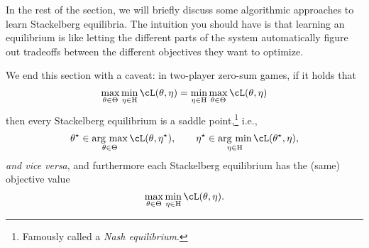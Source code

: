 \documentclass[../../book-main.tex]{subfiles}
\begin{document}
In the rest of the section, we will briefly discuss some algorithmic approaches to learn Stackelberg equilibria. The intuition you should have is that learning an equilibrium is like letting the different parts of the system automatically figure out tradeoffs between the different objectives they want to optimize. 

We end this section with a caveat: in two-player zero-sum games, if it holds that
\begin{equation}
    \max_{\theta \in \Theta}\min_{\eta \in \Eta}\cL(\theta, \eta) = \min_{\eta \in \Eta}\max_{\theta \in \Theta}\cL(\theta, \eta)
\end{equation}
then every Stackelberg equilibrium is a saddle point,\footnote{Famously called a \textit{Nash equilibrium}.} i.e., 
\begin{equation}
    \theta^{\star} \in \argmax_{\theta \in \Theta}\cL(\theta, \eta^{\star}), \qquad \eta^{\star} \in \argmin_{\eta \in \Eta}\cL(\theta^{\star}, \eta),
\end{equation}
\textit{and vice versa}, and furthermore each Stackelberg equilibrium has the (same) objective value \[\max_{\theta \in \Theta}\min_{\eta \in \Eta}\cL(\theta, \eta).\]
\end{document}
